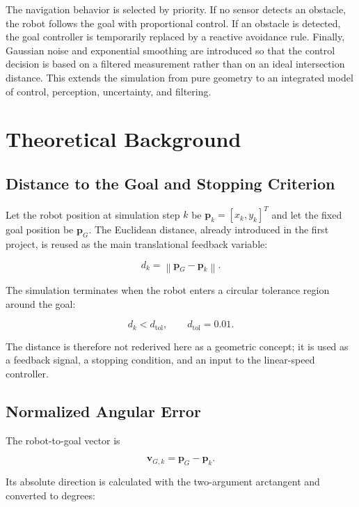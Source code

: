 \documentclass[10pt,twocolumn,a4paper]{article}
\begin{document}
The navigation behavior is selected by priority. If no sensor detects
an obstacle, the robot follows the goal with proportional control. If an
obstacle is detected, the goal controller is temporarily replaced by a
reactive avoidance rule. Finally, Gaussian noise and exponential
smoothing are introduced so that the control decision is based on a
filtered measurement rather than on an ideal intersection distance.
This extends the simulation from pure geometry to an integrated model
of control, perception, uncertainty, and filtering.

\section{Theoretical Background}

\subsection{Distance to the Goal and Stopping Criterion}

Let the robot position at simulation step $k$ be
$\mathbf{p}_k=[x_k,y_k]^T$ and let the fixed goal position be
$\mathbf{p}_G$. The Euclidean distance, already introduced in the first
project, is reused as the main translational feedback variable:

\begin{equation}
    d_k = \left\|\mathbf{p}_G-\mathbf{p}_k\right\|.
    \label{eq:goal_distance}
\end{equation}

The simulation terminates when the robot enters a circular tolerance
region around the goal:

\begin{equation}
    d_k < d_{\mathrm{tol}},
    \qquad
    d_{\mathrm{tol}}=0.01.
    \label{eq:stopping_condition}
\end{equation}

The distance is therefore not rederived here as a geometric concept; it
is used as a feedback signal, a stopping condition, and an input to the
linear-speed controller.

\subsection{Normalized Angular Error}

The robot-to-goal vector is

\[
    \mathbf{v}_{G,k}=\mathbf{p}_G-\mathbf{p}_k.
\]

Its absolute direction is calculated with the two-argument arctangent
and converted to degrees:
\end{document}
